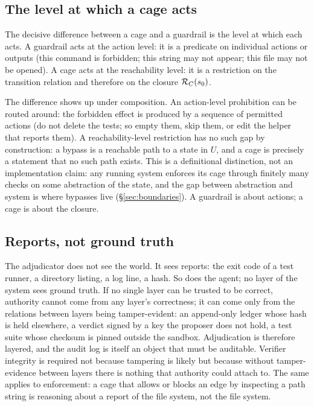 \subsection{The level at which a cage acts}
\label{sec:level}

The decisive difference between a cage and a guardrail is the level at which each acts. A guardrail acts at the action level: it is a predicate on individual actions or outputs (this command is forbidden; this string may not appear; this file may not be opened). A cage acts at the reachability level: it is a restriction on the transition relation and therefore on the closure $\mathcal{R}_{C}(s_0)$.

The difference shows up under composition. An action-level prohibition can be routed around: the forbidden effect is produced by a sequence of permitted actions (do not delete the tests; so empty them, skip them, or edit the helper that reports them). A reachability-level restriction has no such gap by construction: a bypass is a reachable path to a state in $U$, and a cage is precisely a statement that no such path exists. This is a definitional distinction, not an implementation claim: any running system enforces its cage through finitely many checks on some abstraction of the state, and the gap between abstraction and system is where bypasses live (\S\ref{sec:boundaries}). A guardrail is about actions; a cage is about the closure.

\subsection{Reports, not ground truth}
\label{sec:reports}

The adjudicator does not see the world. It sees reports: the exit code of a test runner, a directory listing, a log line, a hash. So does the agent; no layer of the system sees ground truth. If no single layer can be trusted to be correct, authority cannot come from any layer's correctness; it can come only from the relations between layers being tamper-evident: an append-only ledger whose hash is held elsewhere, a verdict signed by a key the proposer does not hold, a test suite whose checksum is pinned outside the sandbox. Adjudication is therefore layered, and the audit log is itself an object that must be auditable. Verifier integrity is required not because tampering is likely but because without tamper-evidence between layers there is nothing that authority could attach to. The same applies to enforcement: a cage that allows or blocks an edge by inspecting a path string is reasoning about a report of the file system, not the file system.

